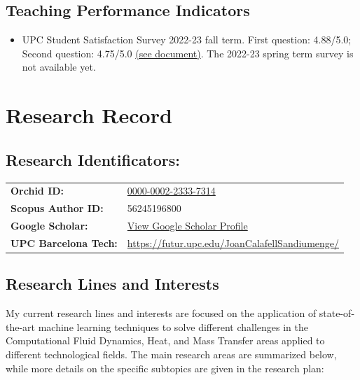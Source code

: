 \documentclass{article}
\begin{document}
\subsection{Teaching Performance Indicators}

\begin{itemize}
\item UPC Student Satisfaction Survey 2022-23 fall term. First question: 4.88/5.0; Second question: 4.75/5.0 \hyperlink{enquestes.1}{(see document)}. The 2022-23 spring term survey is not available yet.
\end{itemize}

\newpage

\section{Research Record}
\subsection{Research Identificators:}

\vspace{0.5cm}


\begin{tabular}{ l l }
 {\bf Orchid ID:}               & \href{https://orcid.org/0000-0002-2333-7314}{0000-0002-2333-7314}  \\ 
 {\bf Scopus Author ID:}        & 56245196800 \\
 {\bf Google Scholar:}          & \href{https://scholar.google.com/citations?user=wPHQb84AAAAJ&hl=en}{View Google Scholar Profile}  \\  
 {\bf UPC Barcelona Tech:}          & \href{https://futur.upc.edu/JoanCalafellSandiumenge/}{https://futur.upc.edu/JoanCalafellSandiumenge/}  \\ 
\end{tabular}

\vspace{0.5cm}

\subsection{Research Lines and Interests}

My current research lines and interests are focused on the application of state-of-the-art machine learning techniques to solve different challenges in the Computational Fluid Dynamics, Heat, and Mass Transfer areas applied to different technological fields. The main research areas are summarized below, while more details on the specific subtopics are given in the research plan: 
\end{document}

